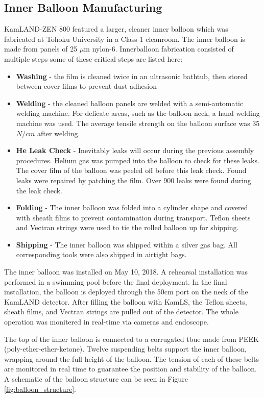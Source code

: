 \subsection*{Inner Balloon Manufacturing}
KamLAND-ZEN 800 featured a larger, cleaner inner balloon which was fabricated at Tohoku University in a Class 1 cleanroom. The inner balloon is made from panels of 25 $\mu$m nylon-6. Innerballoon fabrication consisted of multiple steps some of these critical steps are listed here:
\begin{itemize}
	\item \textbf{Washing} - the film is cleaned twice in an ultrasonic bathtub, then stored between cover films to prevent dust adhesion
	\item \textbf{Welding} - the cleaned balloon panels are welded with a semi-automatic welding machine. For delicate areas, such as the balloon neck, a hand welding machine was used. The average tensile strength on the balloon surface was 35 $N/cm$ after welding.
	\item \textbf{He Leak Check} - Inevitably leaks will occur during the previous assembly procedures. Helium gas was pumped into the balloon to check for these leaks. The cover film of the balloon was peeled off before this leak check. Found leaks were repaired by patching the film. Over 900 leaks were found during the leak check.
	\item \textbf{Folding} - The inner balloon was folded into a cylinder shape and covered with sheath films to prevent contamination during transport. Teflon sheets and Vectran strings were used to tie the rolled balloon up for shipping.
	\item \textbf{Shipping} - The inner balloon was shipped within a silver gas bag. All corresponding tools were also shipped in airtight bags.
\end{itemize}
The inner balloon was installed on May 10, 2018. A rehearsal installation was performed in a swimming pool before the final deployment. In the final installation, the balloon is deployed through the 50cm port on the neck of the KamLAND detector. After filling the balloon with KamLS, the Teflon sheets, sheath films, and Vectran strings are pulled out of the detector. The whole operation was monitered in real-time via cameras and endoscope.

The top of the inner balloon is connected to a corrugated tbue made from PEEK (poly-ether-ether-ketone). Twelve suspending belts support the inner balloon, wrapping around the full height of the balloon. The tension of each of these belts are monitored in real time to guarantee the position and stability of the balloon. A schematic of the balloon structure can be seen in Figure \ref{fig:balloon_structure}. 

